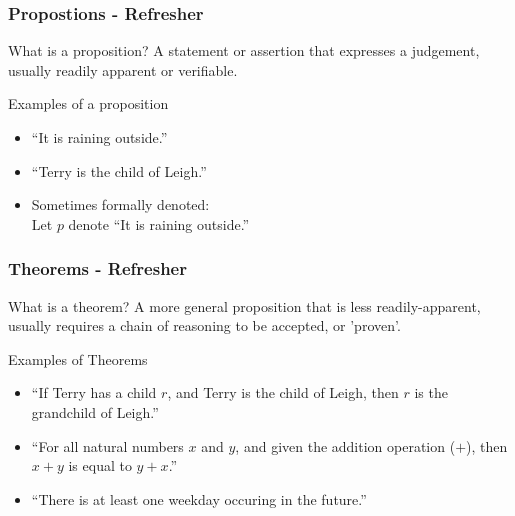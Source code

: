 \documentclass
  [hyperref={colorlinks = true,linkcolor = blue, 
             citecolor = blue, urlcolor = blue}
  ]{beamer}
\begin{document}
\begin{frame}[fragile]
  \frametitle{Propostions - Refresher}
  \begin{block}{What is a proposition?}
  A statement or assertion that expresses a judgement, usually readily
  apparent or verifiable.
  \end{block}
  \begin{block}{Examples of a proposition}
    \begin{itemize}
      \item ``It is raining outside.''
      \item ``Terry is the child of Leigh.''
      \item Sometimes formally denoted: 
            \\ Let $p$ denote ``It is raining outside.''
    \end{itemize}
  \end{block}
\end{frame}

\begin{frame}[fragile]
  \frametitle{Theorems - Refresher}
  \begin{block}{What is a theorem?}
  A more general proposition that is less readily-apparent, usually requires
  a chain of reasoning to be accepted, or 'proven'.
  \end{block}
  \begin{block}{Examples of Theorems}
    \begin{itemize}
      \item ``If Terry has a child $r$, and Terry is the child of Leigh, then
      $r$ is the grandchild of Leigh.''
      \item ``For all natural numbers $x$ and $y$, and given the addition
      operation ($+$), then $x + y$ is equal to $y + x$.''
      \item ``There is at least one weekday occuring in the future.''
    \end{itemize}
  \end{block}
\end{frame}
\end{document}
